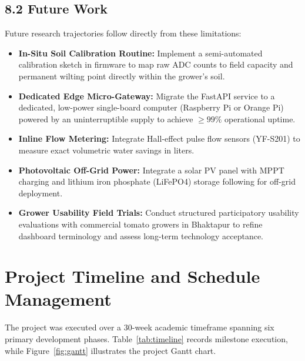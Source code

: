 \documentclass[12pt, a4paper]{article}
\begin{document}
\subsection{8.2 Future Work}
\label{sec:future}

Future research trajectories follow directly from these limitations:
\begin{itemize}[leftmargin=1.2cm, itemsep=3pt]
    \item \textbf{In-Situ Soil Calibration Routine:} Implement a semi-automated calibration sketch in firmware to map raw ADC counts to field capacity and permanent wilting point directly within the grower's soil.
    \item \textbf{Dedicated Edge Micro-Gateway:} Migrate the FastAPI service to a dedicated, low-power single-board computer (Raspberry Pi or Orange Pi) powered by an uninterruptible supply to achieve $\ge 99\%$ operational uptime.
    \item \textbf{Inline Flow Metering:} Integrate Hall-effect pulse flow sensors (YF-S201) to measure exact volumetric water savings in liters.
    \item \textbf{Photovoltaic Off-Grid Power:} Integrate a solar PV panel with MPPT charging and lithium iron phosphate (LiFePO4) storage following \citet{sohan2022} for off-grid deployment.
    \item \textbf{Grower Usability Field Trials:} Conduct structured participatory usability evaluations with commercial tomato growers in Bhaktapur to refine dashboard terminology and assess long-term technology acceptance.
\end{itemize}

\newpage


\appendix
\renewcommand{\thesection}{\Alph{section}}
\renewcommand{\thesubsection}{\Alph{section}.\arabic{subsection}}
\titleformat{\section}{\normalfont\Large\bfseries}{Appendix \thesection}{0.8em}{}

\section{Project Timeline and Schedule Management}
\label{app:timeline}

The project was executed over a 30-week academic timeframe spanning six primary development phases. Table~\ref{tab:timeline} records milestone execution, while Figure~\ref{fig:gantt} illustrates the project Gantt chart.
\end{document}
